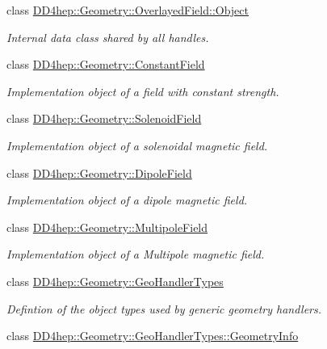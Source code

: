 \begin{DoxyCompactItemize}
class \hyperlink{class_d_d4hep_1_1_geometry_1_1_overlayed_field_1_1_object}{DD4hep::Geometry::OverlayedField::Object}
\begin{DoxyCompactList}\small\item\em Internal data class shared by all handles. \item\end{DoxyCompactList}\item 
class \hyperlink{class_d_d4hep_1_1_geometry_1_1_constant_field}{DD4hep::Geometry::ConstantField}
\begin{DoxyCompactList}\small\item\em Implementation object of a field with constant strength. \item\end{DoxyCompactList}\item 
class \hyperlink{class_d_d4hep_1_1_geometry_1_1_solenoid_field}{DD4hep::Geometry::SolenoidField}
\begin{DoxyCompactList}\small\item\em Implementation object of a solenoidal magnetic field. \item\end{DoxyCompactList}\item 
class \hyperlink{class_d_d4hep_1_1_geometry_1_1_dipole_field}{DD4hep::Geometry::DipoleField}
\begin{DoxyCompactList}\small\item\em Implementation object of a dipole magnetic field. \item\end{DoxyCompactList}\item 
class \hyperlink{class_d_d4hep_1_1_geometry_1_1_multipole_field}{DD4hep::Geometry::MultipoleField}
\begin{DoxyCompactList}\small\item\em Implementation object of a Multipole magnetic field. \item\end{DoxyCompactList}\item 
class \hyperlink{class_d_d4hep_1_1_geometry_1_1_geo_handler_types}{DD4hep::Geometry::GeoHandlerTypes}
\begin{DoxyCompactList}\small\item\em Defintion of the object types used by generic geometry handlers. \item\end{DoxyCompactList}\item 
class \hyperlink{class_d_d4hep_1_1_geometry_1_1_geo_handler_types_1_1_geometry_info}{DD4hep::Geometry::GeoHandlerTypes::GeometryInfo}

\end{DoxyCompactItemize}
